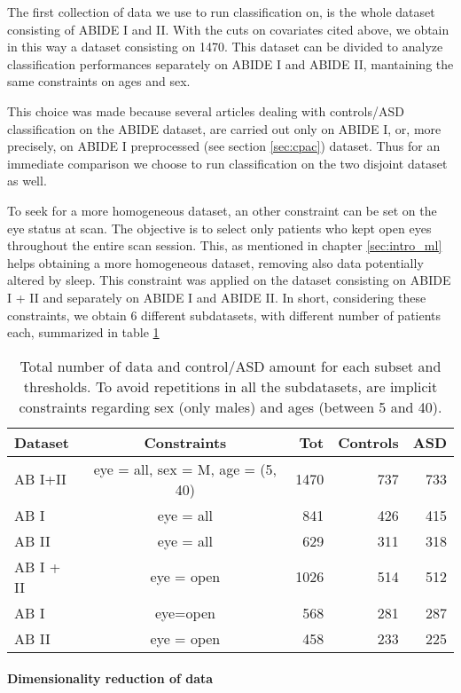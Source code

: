 \documentclass[11pt]{report}
\begin{document}
The first collection of data we use to run classification on, is the whole dataset consisting of ABIDE I and II.
With the cuts on covariates cited above, we obtain in this way a dataset consisting on 1470.
This dataset can be divided to analyze classification performances separately on ABIDE I and ABIDE II, mantaining the same constraints on ages and sex.

This choice was made because several articles dealing with controls/ASD classification on the ABIDE dataset, are carried out only on ABIDE I, or, more precisely, on ABIDE I preprocessed (see section \ref{sec:cpac}) dataset. Thus for an immediate comparison we choose to run classification on the two disjoint dataset as well.

To seek for a more homogeneous dataset, an other constraint can be set on the eye status at scan.
The objective is to select only patients who kept open eyes throughout the entire scan session.
This, as mentioned in chapter \ref{sec:intro_ml} helps obtaining a more homogeneous dataset, removing also data potentially altered by sleep.
This constraint was applied on the dataset consisting on ABIDE I + II and separately on ABIDE I and ABIDE II.
In short, considering these constraints, we obtain 6 different subdatasets, with different number of patients each, summarized in table \ref{tab:controlASD_per_subset}




\begin{table}[!htp]\centering
\scriptsize
\begin{tabular}{lcrrr}\toprule
Dataset &Constraints &Tot &Controls &ASD \\\midrule
AB I+II &eye = all, sex = M, age = (5, 40) &1470 &737 &733 \\
AB I& eye = all&841 &426 &415 \\
AB II&eye = all &629 &311 &318 \\
AB I + II &eye = open &1026 &514 &512 \\
AB I& eye=open &568 &281 &287 \\
AB II &eye = open &458 &233 &225 \\
\bottomrule
\end{tabular}
\caption{Total number of data and control/ASD amount for each subset and thresholds. To avoid repetitions in all the subdatasets, are implicit constraints regarding sex (only males) and ages (between 5 and 40).}
\label{tab:controlASD_per_subset}
\end{table}


\paragraph{Dimensionality reduction of data} \hfill
\end{document}
